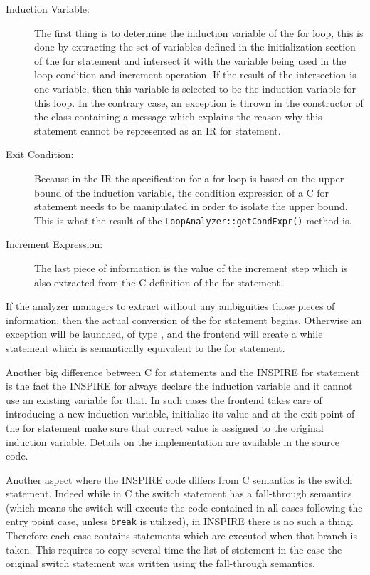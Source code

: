 \begin{description}
\item [Induction Variable:] The first thing is to determine the induction
variable of the for loop, this is done by extracting the set of  variables
defined in the initialization section of the for statement and intersect it with
the variable being used in the loop condition and increment operation. If the
result of the intersection is one variable, then this variable is selected to be
the induction variable for this loop. In the contrary case, an exception is
thrown in the constructor of the  class containing a message
which explains the reason why this statement cannot be represented as an IR for
statement. 

\item[Exit Condition:] Because in the IR the specification for a for loop is
based on the upper bound of the induction variable, the condition expression of a
C for statement needs to be manipulated in order to isolate the upper bound.
This is what the result of the {\tt LoopAnalyzer::getCondExpr()} method is. 

\item[Increment Expression:] The last piece of information is the value of the
increment step which is also extracted from the C definition of the for
statement. 

\end{description}

If the analyzer managers to extract without any ambiguities those pieces of
information, then the actual conversion of the for statement begins. Otherwise
an exception will be launched, of type
, and the frontend will create
a while statement which is semantically equivalent to the for statement.  

Another big difference between C for statements and the INSPIRE for statement is
the fact the INSPIRE for always declare the induction variable and it cannot use
an existing variable for that. In such cases the frontend takes care of
introducing a new induction variable, initialize its value and at the exit point
of the for statement make sure that correct value is assigned to the original
induction variable. Details on the implementation are available in the
source code. 

Another aspect where the INSPIRE code differs from C semantics is the switch
statement. Indeed while in C the switch statement has a fall-through semantics
(which means the switch will execute the code contained in all cases following
the entry point case, unless {\tt break} is utilized), in INSPIRE there is no
such a thing. Therefore each case contains statements which are executed when
that branch is taken. This requires to copy several time the list of statement
in the case the original switch statement was written using the fall-through
semantics. 

